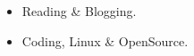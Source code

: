 \documentclass[a4paper, 10pt, titlepage]{article}
\begin{document}

\begin{itemize}
\item Reading \& Blogging.
\item Coding, Linux \& OpenSource.
\end{itemize}



\end{document}
